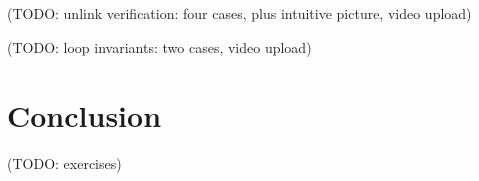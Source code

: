 \documentclass[runningheads]{llncs}
\begin{document}


(TODO: unlink verification: four cases, plus intuitive picture, video upload)

(TODO: loop invariants: two cases, video upload)

\section{Conclusion}\label{sec:conclusion}

(TODO: exercises)




\end{document}
